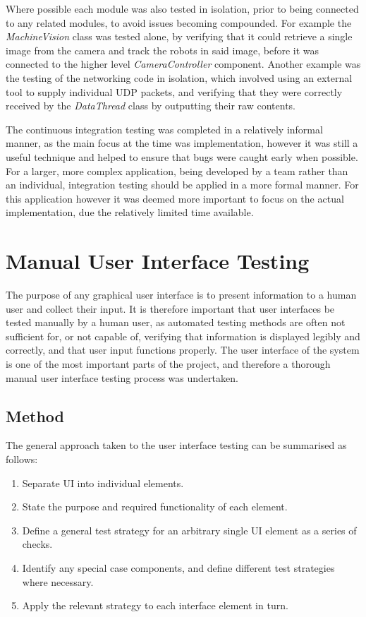 Where possible each module was also tested in isolation, prior to being connected to any related modules, to avoid issues becoming compounded. For example the \textit{MachineVision} class was tested alone, by verifying that it could retrieve a single image from the camera and track the robots in said image, before it was connected to the higher level \textit{CameraController} component. Another example was the testing of the networking code in isolation, which involved using an external tool to supply individual UDP packets, and verifying that they were correctly received by the \textit{DataThread} class by outputting their raw contents. 

The continuous integration testing was completed in a relatively informal manner, as the main focus at the time was implementation, however it was still a useful technique and helped to ensure that bugs were caught early when possible. For a larger, more complex application, being developed by a team rather than an individual, integration testing should be applied in a more formal manner. For this application however it was deemed more important to focus on the actual implementation, due the relatively limited time available.


\section{Manual User Interface Testing} \label{ManualUserInterfaceTesting}
The purpose of any graphical user interface is to present information to a human user and collect their input. It is therefore important that user interfaces be tested manually by a human user, as automated testing methods are often not sufficient for, or not capable of, verifying that information is displayed legibly and correctly, and that user input functions properly. The user interface of the system is one of the most important parts of the project, and therefore a thorough manual user interface testing process was undertaken.

\subsection{Method}
The general approach taken to the user interface testing can be summarised as follows:

\begin{enumerate}
 \item Separate UI into individual elements.
 \item State the purpose and required functionality of each element.
 \item Define a general test strategy for an arbitrary single UI element as a series of checks.
 \item Identify any special case components, and define different test strategies where necessary.
 \item Apply the relevant strategy to each interface element in turn.
\end{enumerate}

